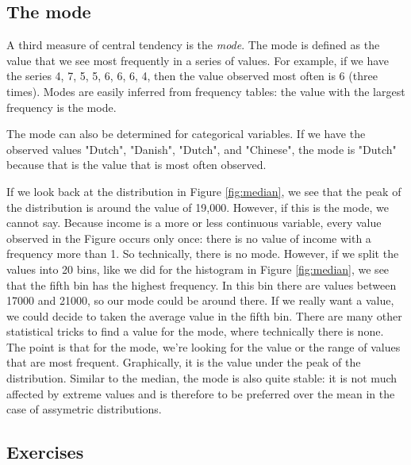 \documentclass[]{report}\usepackage[]{graphicx}\usepackage[]{color}
\begin{document}
\subsection{The mode}
A third measure of central tendency is the \textit{mode}. The mode is defined as the value that we see most frequently in a series of values. For example, if we have the series 4, 7, 5, 5, 6, 6, 6, 4, then the value observed most often is 6 (three times). Modes are easily inferred from frequency tables: the value with the largest frequency is the mode.  

The mode can also be determined for categorical variables. If we have the observed values "Dutch", "Danish", "Dutch", and "Chinese", the mode is "Dutch" because that is the value that is most often observed. 

If we look back at the distribution in Figure \ref{fig:median}, we see that the peak of the distribution is around the value of 19,000. However, if this is the mode, we cannot say. Because income is a more or less continuous variable, every value observed in the Figure occurs only once: there is no value of income with a frequency more than 1. So technically, there is no mode. However, if we split the values into 20 bins, like we did for the histogram in Figure \ref{fig:median}, we see that the fifth bin has the highest frequency. In this bin there are values between 17000 and 21000, so our mode could be around there. If we really want a value, we could decide to taken the average value in the fifth bin. There are many other statistical tricks to find a value for the mode, where technically there is none. The point is that for the mode, we're looking for the value or the range of values that are most frequent. Graphically, it is the value under the peak of the distribution. Similar to the median, the mode is also quite stable: it is not much affected by extreme values and is therefore to be preferred over the mean in the case of assymetric distributions. 



\subsection{Exercises}
\end{document}
